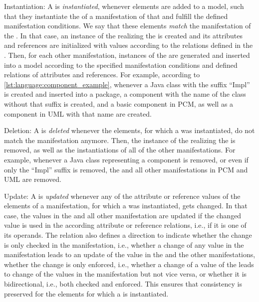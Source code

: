 \begin{properdescription}
\item[Instantiation:] 
A \commonality is \emph{instantiated}, whenever elements are added to a model, such that they instantiate the \metaclasses of a manifestation of that \commonality and fulfill the defined manifestation conditions.
We say that these elements \emph{match} the manifestation of the \commonality.
In that case, an instance of the \metaclass realizing the \commonality is created and its attributes and references are initialized with values according to the relations defined in the \commonality.
Then, for each other manifestation, instances of the \metaclasses are generated and inserted into a model according to the specified manifestation conditions and defined relations of attributes and references.
For example, according to \autoref{lst:language:component_example}, whenever a Java class with the suffix \enquote{Impl} is created and inserted into a package, a component \commonality with the name of the class without that suffix is created, and a basic component in \gls{PCM}, as well as a component in \gls{UML} with that name are created.

\item[Deletion:] 
A \commonality is \emph{deleted} whenever the elements, for which a \commonality was instantiated, do not match the manifestation anymore.
Then, the instance of the \metaclass realizing the \commonality is removed, as well as the instantiations of all \metaclasses of the other manifestations.
For example, whenever a Java class representing a component is removed, or even if only the \enquote{Impl} suffix is removed, the \commonality and all other manifestations in \gls{PCM} and \gls{UML} are removed.

\item[Update:] 
A \commonality is \emph{updated} whenever any of the attribute or reference values of the elements of a manifestation, for which a \commonality was instantiated, gets changed.
In that case, the values in the \commonality and all other manifestation are updated if the changed value is used in the according attribute or reference relations, i.e., if it is one of its operands.
The relation also defines a direction to indicate whether the change is only checked in the manifestation, i.e., whether a change of any value in the manifestation leads to an update of the value in the \commonality and the other manifestations, whether the change is only enforced, i.e., whether a change of a value of the \commonality leads to change of the values in the manifestation but not vice versa, or whether it is bidirectional, i.e., both checked and enforced.
This ensures that consistency is preserved for the elements for which a \commonality is instantiated.
\end{properdescription}

